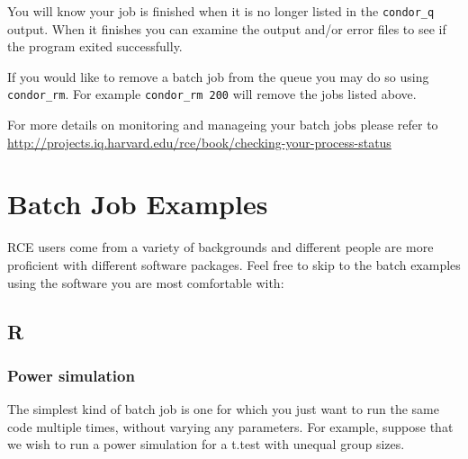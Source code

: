 \documentclass[]{book}
\begin{document}
You will know your job is finished when it is no longer listed in the
\texttt{condor\_q} output. When it finishes you can examine the output
and/or error files to see if the program exited successfully.

If you would like to remove a batch job from the queue you may do so
using \texttt{condor\_rm}. For example \texttt{condor\_rm\ 200} will
remove the jobs listed above.

For more details on monitoring and manageing your batch jobs please
refer to
\url{http://projects.iq.harvard.edu/rce/book/checking-your-process-status}

\chapter{Batch Job Examples}\label{batch-job-examples}

RCE users come from a variety of backgrounds and different people are
more proficient with different software packages. Feel free to skip to
the batch examples using the software you are most comfortable with:

\section{R}\label{r-1}

\subsection{Power simulation}\label{power-simulation}

The simplest kind of batch job is one for which you just want to run the
same code multiple times, without varying any parameters. For example,
suppose that we wish to run a power simulation for a t.test with unequal
group sizes.
\end{document}
